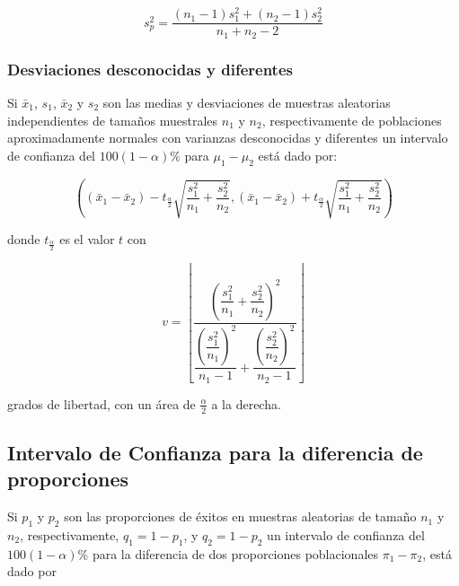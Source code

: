 \documentclass[letterpaper,]{book}
\begin{document}
\begin{equation} 
s_p^2 = \dfrac{\left(n_1 - 1 \right)s_1^2+\left(n_2 - 1 \right)s_2^2}{n_1 +n_2 -2} 
\label{eq:sp}
\end{equation}

\hypertarget{desviaciones-desconocidas-y-diferentes}{%
\subsubsection{Desviaciones desconocidas y diferentes}\label{desviaciones-desconocidas-y-diferentes}}

Si \(\bar{x}_1\), \(s_1\), \(\bar{x}_2\) y \(s_2\) son las medias y desviaciones de muestras aleatorias independientes de tamaños muestrales \(n_1\) y \(n_2\), respectivamente de poblaciones aproximadamente normales con varianzas desconocidas y diferentes un intervalo de confianza del \(100\left(1-\alpha \right)\%\) para \(\mu_1 - \mu_2\) está dado por:

\begin{equation} 
\left( \left( \bar{x}_1 - \bar{x}_2 \right) - t_{\frac{\alpha}{2}}\sqrt{\dfrac{s_1^2}{n_1} + \dfrac{s_2^2}{n_2}} , \left( \bar{x}_1 - \bar{x}_2 \right) + t_{\frac{\alpha}{2}}\sqrt{\dfrac{s_1^2}{n_1} + \dfrac{s_2^2}{n_2}} \right) 
\label{eq:ic2msdd}
\end{equation}

donde \(t_{\frac{\alpha}{2}}\) es el valor \(t\) con

\begin{equation} 
v = \left\lfloor\dfrac{\left(\dfrac{s_1^2}{n_1} + \dfrac{s_2^2}{n_2} \right)^2}{\dfrac{\left( \dfrac{s_1^2}{n_1} \right)^2}{n_1-1}+\dfrac{\left( \dfrac{s_2^2}{n_2} \right)^2}{n_2-1}}\right\rfloor
\label{eq:dfsdd}
\end{equation}

grados de libertad, con un área de \(\frac{\alpha}{2}\) a la derecha.

\hypertarget{intervalo-de-confianza-para-la-diferencia-de-proporciones}{%
\subsection{Intervalo de Confianza para la diferencia de proporciones}\label{intervalo-de-confianza-para-la-diferencia-de-proporciones}}

Si \(p_1\) y \(p_2\) son las proporciones de éxitos en muestras aleatorias de tamaño \(n_1\) y \(n_2\), respectivamente, \(q_1 = 1- p_1\), y \(q_2 = 1- p_2\) un intervalo de confianza del \(100\left(1- \alpha \right)\%\) para la diferencia de dos proporciones poblacionales \(\pi_1-\pi_2\), está dado por
\end{document}
